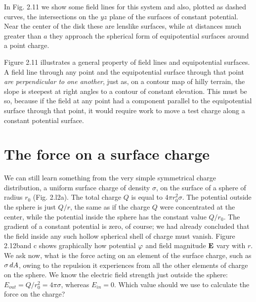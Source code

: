 In Fig. 2.11 we show some field lines for this system and also,
plotted as dashed curves, the intersections on the $yz$ plane of the surfaces
of constant potential. Near the center of the disk these are
lenslike surfaces, while at distances much greater than $a$ they 
approach the spherical form of equipotential surfaces around a point
charge.

Figure 2.11 illustrates a general property of field lines and 
equipotential surfaces. A field line through any point and the equipotential
surface through that point \emph{are perpendicular to one another}, just as,
on a contour map of hilly terrain, the slope is steepest at right angles
to a contour of constant elevation. This must be so, because if the
field at any point had a component parallel to the equipotential surface
through that point, it would require work to move a test charge
along a constant potential surface.




\section{The force on a surface charge}

We can still learn something from the very simple symmetrical
charge distribution, a uniform surface charge of density $\sigma$, on the
surface of a sphere of radius $r_0$ (Fig. 2.l2a). The total charge $Q$ is
equal to $4\pi r_0^2\sigma$. The potential outside the sphere is just $Q/r$, the
same as if the charge $Q$ were concentrated at the center, while the
potential inside the sphere has the constant value $Q/r_0$. The gradient
of a constant potential is zero, of course; we had already concluded
that the field inside any such hollow spherical shell of charge must
vanish. Figure 2.12band c shows graphically how potential $\varphi$ and
field magnitude $\mathbf{E}$ vary with $r$. We ask now, what is the force acting
on an element of the surface charge, such as $\sigma\mathop{d\!} A$, owing to the repulsion
it experiences from all the other elements of charge on the
sphere. We know the electric field strength just outside the sphere:
$E_{out}=Q/r_0^2=4\pi\sigma$, whereas $E_{in}=0$. Which value should we use
to calculate the force on the charge?

